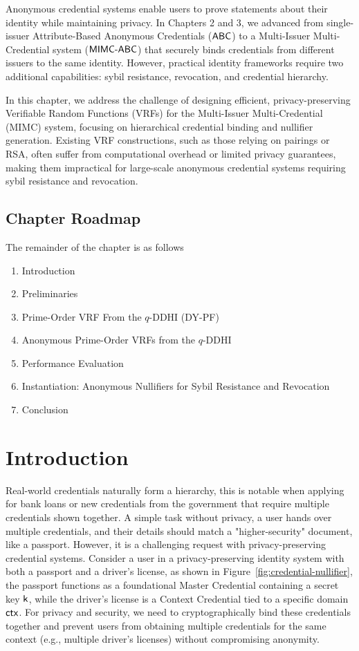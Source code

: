 Anonymous credential systems enable users to prove statements about their identity while maintaining privacy. In Chapters 2 and 3, we advanced from single-issuer Attribute-Based Anonymous Credentials ($\mathsf{ABC}$) to a Multi-Issuer Multi-Credential system ($\mathsf{MIMC\text{-}ABC}$) that securely binds credentials from different issuers to the same identity. However, practical identity frameworks require two additional capabilities: sybil resistance, revocation, and credential hierarchy.

In this chapter, we address the challenge of designing efficient, privacy-preserving Verifiable Random Functions (VRFs) for the Multi-Issuer Multi-Credential (MIMC) system, focusing on hierarchical credential binding and nullifier generation. Existing VRF constructions, such as those relying on pairings or RSA, often suffer from computational overhead or limited privacy guarantees, making them impractical for large-scale anonymous credential systems requiring sybil resistance and revocation.

\subsection*{Chapter Roadmap}
The remainder of the chapter is as follows
\begin{enumerate}
    \item Introduction
    \item Preliminaries
    \item Prime-Order VRF From the $q$-DDHI (DY-PF)
    \item Anonymous Prime-Order VRFs from the $q$-DDHI
    \item Performance Evaluation
    \item Instantiation: Anonymous Nullifiers for Sybil Resistance and Revocation
    \item Conclusion
\end{enumerate}

\section{Introduction}
Real-world credentials naturally form a hierarchy, this is notable when applying for bank loans or new credentials from the government that require multiple credentials shown together. A simple task without privacy, a user hands over multiple credentials, and their details should match a "higher-security" document, like a passport. However, it is a challenging request with privacy-preserving credential systems. Consider a user in a privacy-preserving identity system with both a passport and a driver's license, as shown in Figure~\ref{fig:credential-nullifier}, the passport functions as a foundational Master Credential containing a secret key $\mathsf{k}$, while the driver's license is a Context Credential tied to a specific domain $\mathsf{ctx}$. For privacy and security, we need to cryptographically bind these credentials together and prevent users from obtaining multiple credentials for the same context (e.g., multiple driver's licenses) without compromising anonymity.

